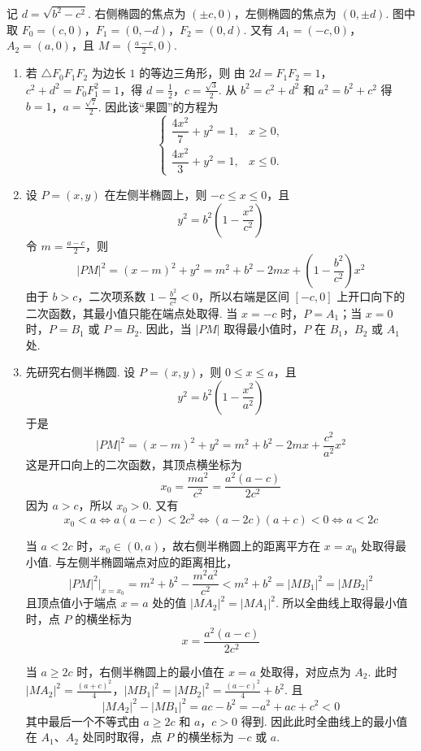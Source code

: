 \begin{solution}
记 \(d=\sqrt{b^2-c^2}\). 右侧椭圆的焦点为 \((\pm c,0)\)，左侧椭圆的焦点为 \((0,\pm d)\). 图中取 \(F_0=(c,0)\)，\(F_1=(0,-d)\)，\(F_2=(0,d)\).
又有 \(A_1=(-c,0)\)，\(A_2=(a,0)\)，且 \(M=\left(\frac{a-c}{2},0\right)\).

\begin{enumerate}
\item 若 \(\triangle F_0F_1F_2\) 为边长 \(1\) 的等边三角形，则
由 \(2d=F_1F_2=1\)，\(c^2+d^2=F_0F_1^2=1\)，得 \(d=\frac{1}{2}\)，\(c=\frac{\sqrt{3}}{2}\). 从 \(b^2=c^2+d^2\) 和 \(a^2=b^2+c^2\) 得 \(b=1\)，\(a=\frac{\sqrt{7}}{2}\).
因此该“果圆”的方程为
\[
\begin{cases}
\dfrac{4x^2}{7}+y^2=1,&x\geqslant0,\\[6pt]
\dfrac{4x^2}{3}+y^2=1,&x\leqslant0.
\end{cases}
\]

\item 设 \(P=(x,y)\) 在左侧半椭圆上，则 \(-c\leqslant x\leqslant0\)，且
\[
y^2=b^2\left(1-\frac{x^2}{c^2}\right)
\]
令 \(m=\frac{a-c}{2}\)，则
\[
|PM|^2=(x-m)^2+y^2=m^2+b^2-2mx+\left(1-\frac{b^2}{c^2}\right)x^2
\]
由于 \(b>c\)，二次项系数 \(1-\frac{b^2}{c^2}<0\)，所以右端是区间 \([-c,0]\) 上开口向下的二次函数，其最小值只能在端点处取得. 当 \(x=-c\) 时，\(P=A_1\)；当 \(x=0\) 时，\(P=B_1\) 或 \(P=B_2\). 因此，当 \(|PM|\) 取得最小值时，\(P\) 在 \(B_1\)，\(B_2\) 或 \(A_1\) 处.

\item 先研究右侧半椭圆. 设 \(P=(x,y)\)，则 \(0\leqslant x\leqslant a\)，且
\[
y^2=b^2\left(1-\frac{x^2}{a^2}\right)
\]
于是
\[
|PM|^2=(x-m)^2+y^2=m^2+b^2-2mx+\frac{c^2}{a^2}x^2
\]
这是开口向上的二次函数，其顶点横坐标为
\[
x_0=\frac{m a^2}{c^2}=\frac{a^2(a-c)}{2c^2}
\]
因为 \(a>c\)，所以 \(x_0>0\). 又有
\[
x_0<a\Longleftrightarrow a(a-c)<2c^2\Longleftrightarrow(a-2c)(a+c)<0\Longleftrightarrow a<2c
\]

当 \(a<2c\) 时，\(x_0\in(0,a)\)，故右侧半椭圆上的距离平方在 \(x=x_0\) 处取得最小值. 与左侧半椭圆端点对应的距离相比，
\[
|PM|^2\big|_{x=x_0}=m^2+b^2-\frac{m^2a^2}{c^2}<m^2+b^2=|MB_1|^2=|MB_2|^2
\]
且顶点值小于端点 \(x=a\) 处的值 \(|MA_2|^2=|MA_1|^2\). 所以全曲线上取得最小值时，点 \(P\) 的横坐标为
\[
x=\frac{a^2(a-c)}{2c^2}
\]

当 \(a\geqslant2c\) 时，右侧半椭圆上的最小值在 \(x=a\) 处取得，对应点为 \(A_2\). 此时
\(|MA_2|^2=\frac{(a+c)^2}{4}\)，\(|MB_1|^2=|MB_2|^2=\frac{(a-c)^2}{4}+b^2\).
且
\[
|MA_2|^2-|MB_1|^2=ac-b^2=-a^2+ac+c^2<0
\]
其中最后一个不等式由 \(a\geqslant2c\) 和 \(a\)，\(c>0\) 得到. 因此此时全曲线上的最小值在 \(A_1\)、\(A_2\) 处同时取得，点 \(P\) 的横坐标为 \(-c\) 或 \(a\).
\end{enumerate}
\end{solution}
